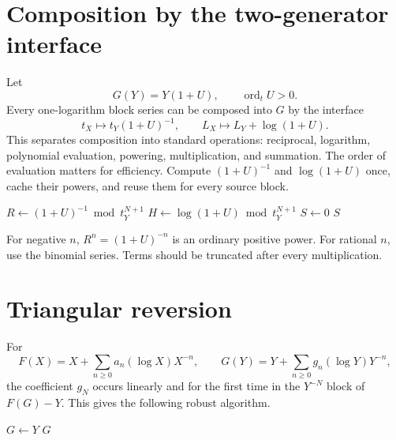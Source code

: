 \documentclass[11pt,oneside]{book}
\theoremstyle{definition}
\theoremstyle{remark}
\DeclareMathOperator{\ord}{ord}
\newcommand{\compinv}{^{\langle-1\rangle}}
\newcommand{\compose}{\mathbin{\circ}}
\begin{document}
\section{Composition by the two-generator interface}
Let
\[
 G(Y)=Y(1+U),\qquad \ord_tU>0.
\]
Every one-logarithm block series can be composed into $G$ by the interface
\begin{equation}\label{eq:implementation-generator-interface}
 t_X\longmapsto t_Y(1+U)^{-1},\qquad
 L_X\longmapsto L_Y+\log(1+U).
\end{equation}
This separates composition into standard operations:
reciprocal, logarithm, polynomial evaluation, powering, multiplication, and
summation. The order of evaluation matters for efficiency. Compute
$(1+U)^{-1}$ and $\log(1+U)$ once, cache their powers, and reuse them for
every source block.

\begin{algorithm}[H]
\caption{Generator-based composition}
\KwOut{$F\compose G\bmod t_Y^{N+1}$}
$R\leftarrow(1+U)^{-1}\bmod t_Y^{N+1}$\;
$H\leftarrow\log(1+U)\bmod t_Y^{N+1}$\;
$S\leftarrow0$\;
\Return $S$\;
\end{algorithm}

For negative $n$, $R^n=(1+U)^{-n}$ is an ordinary positive power. For
rational $n$, use the binomial series. Terms should be truncated after every
multiplication.

\section{Triangular reversion}
For
\[
 F(X)=X+\sum_{n\ge0}a_n(\log X)X^{-n},
\qquad
 G(Y)=Y+\sum_{n\ge0}g_n(\log Y)Y^{-n},
\]
the coefficient $g_N$ occurs linearly and for the first time in the
$Y^{-N}$ block of $F(G)-Y$. This gives the following robust algorithm.

\begin{algorithm}[H]
\caption{Triangular polynomial--logarithmic reversion}
\KwOut{$G=F\compinv\bmod Y^{-N-1}$}
$G\leftarrow Y$\;
\Return $G$\;
\end{algorithm}
\end{document}
